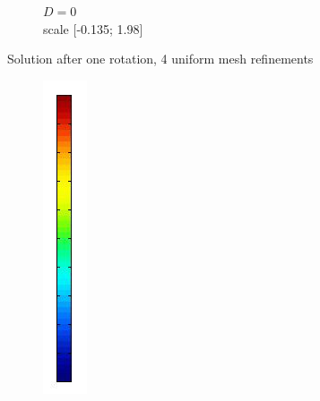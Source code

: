 \documentclass[mathserif]{beamer}
\begin{document}
\begin{frame}
\begin{figure}[H]
\begin{subfigure}[H]{0.3\textwidth}
		\vspace{-3mm}
		\caption{$D = 0$\\\vspace{-2mm}scale [-0.135; 1.98]}
	\end{subfigure}
	\vspace{-3mm}
	\caption{Solution after one rotation, 4 uniform mesh refinements}	
\end{figure}
\vspace{-8mm}
\begin{figure}[H]
\centering
	\begin{subfigure}[H]{0.02\textwidth}
		\includegraphics[width=\textwidth]{images/timedep-multiscale/stability/scale.jpg}

\end{subfigure}
\end{figure}
\end{frame}
\end{document}
